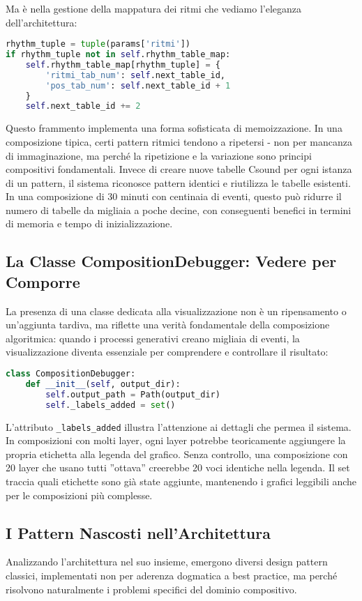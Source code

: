 Ma è nella gestione della mappatura dei ritmi che vediamo l'eleganza dell'architettura:

\begin{lstlisting}[language=Python]
rhythm_tuple = tuple(params['ritmi'])
if rhythm_tuple not in self.rhythm_table_map:
    self.rhythm_table_map[rhythm_tuple] = {
        'ritmi_tab_num': self.next_table_id,
        'pos_tab_num': self.next_table_id + 1
    }
    self.next_table_id += 2
\end{lstlisting}

Questo frammento implementa una forma sofisticata di memoizzazione. In una composizione tipica, certi pattern ritmici tendono a ripetersi - non per mancanza di immaginazione, ma perché la ripetizione e la variazione sono principi compositivi fondamentali. Invece di creare nuove tabelle Csound per ogni istanza di un pattern, il sistema riconosce pattern identici e riutilizza le tabelle esistenti. In una composizione di 30 minuti con centinaia di eventi, questo può ridurre il numero di tabelle da migliaia a poche decine, con conseguenti benefici in termini di memoria e tempo di inizializzazione.
\subsection{La Classe CompositionDebugger: Vedere per Comporre}
La presenza di una classe dedicata alla visualizzazione non è un ripensamento o un'aggiunta tardiva, ma riflette una verità fondamentale della composizione algoritmica: quando i processi generativi creano migliaia di eventi, la visualizzazione diventa essenziale per comprendere e controllare il risultato:

\begin{lstlisting}[language=Python]
class CompositionDebugger:
    def __init__(self, output_dir):
        self.output_path = Path(output_dir)
        self._labels_added = set()
\end{lstlisting}

L'attributo \texttt{\_labels\_added} illustra l'attenzione ai dettagli che permea il sistema. In composizioni con molti layer, ogni layer potrebbe teoricamente aggiungere la propria etichetta alla legenda del grafico. Senza controllo, una composizione con 20 layer che usano tutti ''ottava'' creerebbe 20 voci identiche nella legenda. Il set traccia quali etichette sono già state aggiunte, mantenendo i grafici leggibili anche per le composizioni più complesse.
\subsection{I Pattern Nascosti nell'Architettura}
Analizzando l'architettura nel suo insieme, emergono diversi design pattern classici, implementati non per aderenza dogmatica a best practice, ma perché risolvono naturalmente i problemi specifici del dominio compositivo.

